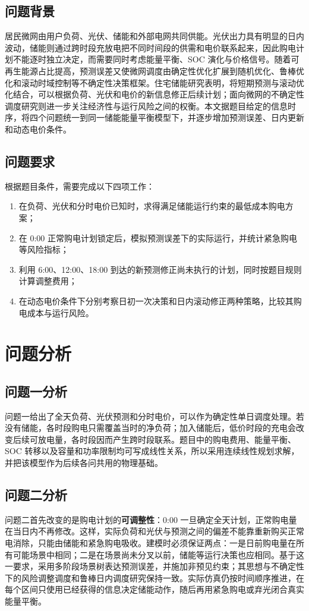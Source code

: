 \documentclass[withoutpreface]{cumcmthesis}
\begin{document}
\subsection{问题背景}
居民微网由用户负荷、光伏、储能和外部电网共同供能。光伏出力具有明显的日内波动，储能则通过跨时段充放电把不同时间段的供需和电价联系起来，因此购电计划不能逐时独立决定，而需要同时考虑能量平衡、SOC 演化与价格信号。随着可再生能源占比提高，预测误差又使微网调度由确定性优化扩展到随机优化、鲁棒优化和滚动时域控制等不确定性决策框架\cite{lu2020,hu2021mpc}。住宅储能研究表明，将短期预测与滚动优化结合，可以根据负荷、光伏和电价的新信息修正后续计划\cite{abedi2023rolling}；面向微网的不确定性调度研究则进一步关注经济性与运行风险之间的权衡\cite{yuan2023robust,zhao2024ddtmpc}。本文据题目给定的信息时序，将四个问题统一到同一储能能量平衡模型下，并逐步增加预测误差、日内更新和动态电价条件。

\subsection{问题要求}
根据题目条件，需要完成以下四项工作：
\begin{enumerate}
  \item 在负荷、光伏和分时电价已知时，求得满足储能运行约束的最低成本购电方案；
  \item 在 0:00 正常购电计划锁定后，模拟预测误差下的实际运行，并统计紧急购电等风险指标；
  \item 利用 6:00、12:00、18:00 到达的新预测修正尚未执行的计划，同时按题目规则计算调整费用；
  \item 在动态电价条件下分别考察日初一次决策和日内滚动修正两种策略，比较其购电成本与运行风险。
\end{enumerate}

\section{问题分析}
\subsection{问题一分析}
问题一给出了全天负荷、光伏预测和分时电价，可以作为确定性单日调度处理。若没有储能，各时段购电只需覆盖当时的净负荷；加入储能后，低价时段的充电会改变后续可放电量，各时段因而产生跨时段联系。题目中的购电费用、能量平衡、SOC 转移以及容量和功率限制均可写成线性关系，所以采用连续线性规划求解，并把该模型作为后续各问共用的物理基础。

\subsection{问题二分析}
问题二首先改变的是购电计划的\textbf{可调整性}：0:00 一旦确定全天计划，正常购电量在当日内不再修改。这样，实际负荷和光伏与预测之间的偏差不能靠重新购买正常电消除，只能由储能和紧急购电吸收。建模时必须保证两点：一是日前购电量在所有可能场景中相同；二是在场景尚未分叉以前，储能等运行决策也应相同。基于这一要求，采用多阶段场景树表达预测误差，并施加非预见约束；其思想与不确定性下的风险调整调度和鲁棒日内调度研究保持一致\cite{yuan2023robust,zhao2024ddtmpc}。实际仿真仍按时间顺序推进，在每个区间只使用已经获得的信息决定储能动作，随后再用紧急购电或弃光闭合真实能量平衡。
\end{document}
